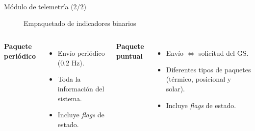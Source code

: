 \begin{frame}{Módulo de telemetría (2/2)}

\begin{figure}
\centering
\resizebox{0.82\textwidth}{!}
{
}
\caption{Empaquetado de indicadores binarios}
\end{figure}

\begin{columns}


\begin{center}
\textbf{Paquete periódico}
\end{center}

\begin{itemize}
\item Envío periódico (0.2 Hz).
\item Toda la información del sistema.
\item Incluye \emph{flags} de estado.
\end{itemize}


\begin{center}
\textbf{Paquete puntual}
\end{center}

\begin{itemize}
\item Envío $\Leftrightarrow$ solicitud del GS.
\item Diferentes tipos de paquetes (térmico, posicional y solar).
\item Incluye \emph{flags} de estado.
\end{itemize}

\end{columns}

\end{frame}


